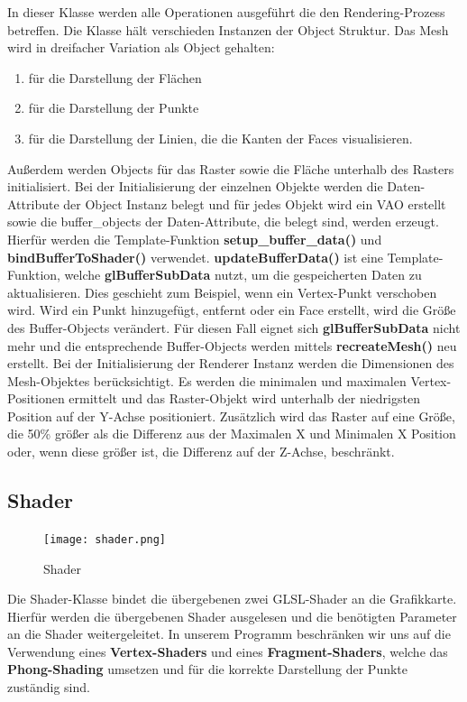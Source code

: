 	\noindent In dieser Klasse werden alle Operationen ausgeführt die den Rendering-Prozess betreffen. Die Klasse hält verschieden Instanzen der Object Struktur. Das Mesh wird in dreifacher Variation als Object gehalten:
	\begin{enumerate}
	\item für die Darstellung der Flächen
	\item für die Darstellung der Punkte
	\item für die Darstellung der Linien, die die Kanten der Faces visualisieren.
	\end{enumerate}
Außerdem werden Objects für das Raster sowie die Fläche unterhalb des Rasters initialisiert.\newline
Bei der Initialisierung der einzelnen Objekte werden die Daten-Attribute der Object Instanz belegt und für jedes Objekt wird ein VAO erstellt sowie die buffer\_objects der Daten-Attribute, die belegt sind, werden erzeugt. Hierfür werden die Template-Funktion \textbf{setup\_buffer\_data()} und \textbf{bindBufferToShader()} verwendet. \textbf{updateBufferData()} ist eine Template-Funktion, welche \textbf{glBufferSubData} nutzt, um die gespeicherten Daten zu aktualisieren. Dies geschieht zum Beispiel, wenn ein Vertex-Punkt verschoben wird. Wird ein Punkt hinzugefügt, entfernt oder ein Face erstellt, wird die Größe des Buffer-Objects verändert. Für diesen Fall eignet sich \textbf{glBufferSubData} nicht mehr und die entsprechende Buffer-Objects werden mittels \textbf{recreateMesh()} neu erstellt.\newline
Bei der Initialisierung der Renderer Instanz werden die Dimensionen des Mesh-Objektes berücksichtigt. Es werden die minimalen und maximalen Vertex-Positionen ermittelt und das Raster-Objekt wird unterhalb der niedrigsten Position auf der Y-Achse positioniert. Zusätzlich wird das Raster auf eine Größe, die 50\% größer als die Differenz aus der Maximalen X und Minimalen X Position oder, wenn diese größer ist, die Differenz auf der Z-Achse, beschränkt.

\subsection{Shader}

	\begin{figure}[H]
	\centering
	\texttt{[image: shader.png]}
	\caption{Shader}
	\label{fig7}
	\end{figure}

\noindent Die Shader-Klasse bindet die übergebenen zwei GLSL-Shader an die Grafikkarte. Hierfür werden die übergebenen Shader ausgelesen und die benötigten Parameter an die Shader weitergeleitet. In unserem Programm beschränken wir uns auf die Verwendung eines \textbf{Vertex-Shaders} und eines \textbf{Fragment-Shaders}, welche das \textbf{Phong-Shading} umsetzen und für die korrekte Darstellung der Punkte zuständig sind.

